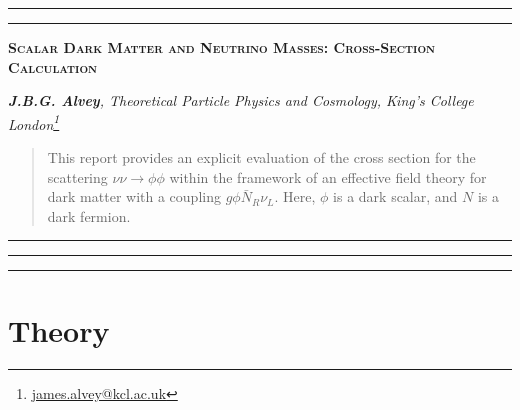 \documentclass[10pt]{article}
\renewcommand*{\thefootnote}{\fnsymbol{footnote}}
\begin{document}
\hrule
\vspace{1pt}
\hrule
\begin{center}
\large\textsc{\color{darkblue}\textbf{Scalar Dark Matter and Neutrino Masses: Cross-Section Calculation}}
\vspace{5pt}

\footnotesize\textit{\textbf{J.B.G. Alvey}, Theoretical Particle Physics and Cosmology, King's College London\footnote{\href{mailto:james.alvey@kcl.ac.uk}{james.alvey@kcl.ac.uk}}}
\end{center}
\begin{abstract}
\noindent This report provides an explicit evaluation of the cross section for the scattering $\nu\nu \rightarrow \phi\phi$ within the framework of an effective field theory for dark matter with a coupling $g\phi \bar{N}_R \nu_L$. Here, $\phi$ is a dark scalar, and $N$ is a dark fermion.
\end{abstract}
\hrule
\tableofcontents
\vspace{5pt}
\hrule
\vspace{1pt}
\hrule
\vspace{10pt}
\renewcommand{\thefootnote}{\tiny\textbf{\arabic{section}.\arabic{footnote}}}

\section{Theory}
\end{document}
